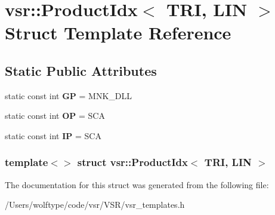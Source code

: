 \hypertarget{structvsr_1_1_product_idx_3_01_t_r_i_00_01_l_i_n_01_4}{\section{vsr\-:\-:Product\-Idx$<$ T\-R\-I, L\-I\-N $>$ Struct Template Reference}
\label{structvsr_1_1_product_idx_3_01_t_r_i_00_01_l_i_n_01_4}
}
\subsection*{Static Public Attributes}
\begin{DoxyCompactItemize}
\item 
\hypertarget{structvsr_1_1_product_idx_3_01_t_r_i_00_01_l_i_n_01_4_af338d52f2e75149982fe1f9bd0dffdba}{static const int {\bfseries G\-P} = M\-N\-K\-\_\-\-D\-L\-L}\label{structvsr_1_1_product_idx_3_01_t_r_i_00_01_l_i_n_01_4_af338d52f2e75149982fe1f9bd0dffdba}

\item 
\hypertarget{structvsr_1_1_product_idx_3_01_t_r_i_00_01_l_i_n_01_4_ac9a4ecfdbf67b870136c5c0a34c33089}{static const int {\bfseries O\-P} = S\-C\-A}\label{structvsr_1_1_product_idx_3_01_t_r_i_00_01_l_i_n_01_4_ac9a4ecfdbf67b870136c5c0a34c33089}

\item 
\hypertarget{structvsr_1_1_product_idx_3_01_t_r_i_00_01_l_i_n_01_4_a862be025a8a263ea4cde33d4301573c6}{static const int {\bfseries I\-P} = S\-C\-A}\label{structvsr_1_1_product_idx_3_01_t_r_i_00_01_l_i_n_01_4_a862be025a8a263ea4cde33d4301573c6}

\end{DoxyCompactItemize}
\subsubsection*{template$<$$>$ struct vsr\-::\-Product\-Idx$<$ T\-R\-I, L\-I\-N $>$}



The documentation for this struct was generated from the following file\-:\begin{DoxyCompactItemize}
\item 
/\-Users/wolftype/code/vsr/\-V\-S\-R/vsr\-\_\-templates.\-h\end{DoxyCompactItemize}

